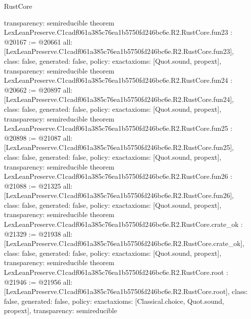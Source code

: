 \begin{lexlean}{RustCore}
\begin{coremodule}
{  transparency: semireducible
}
theorem LexLeanPreserve.C1cadf061a385c76ea1b5750fd246bc6e.R2.RustCore.fun23 : @20167 := @20661 {
  all: [LexLeanPreserve.C1cadf061a385c76ea1b5750fd246bc6e.R2.RustCore.fun23],
  class: false,
  generated: false,
  policy: exact{axioms: [Quot.sound, propext]},
  transparency: semireducible
}
theorem LexLeanPreserve.C1cadf061a385c76ea1b5750fd246bc6e.R2.RustCore.fun24 : @20662 := @20897 {
  all: [LexLeanPreserve.C1cadf061a385c76ea1b5750fd246bc6e.R2.RustCore.fun24],
  class: false,
  generated: false,
  policy: exact{axioms: [Quot.sound, propext]},
  transparency: semireducible
}
theorem LexLeanPreserve.C1cadf061a385c76ea1b5750fd246bc6e.R2.RustCore.fun25 : @20898 := @21087 {
  all: [LexLeanPreserve.C1cadf061a385c76ea1b5750fd246bc6e.R2.RustCore.fun25],
  class: false,
  generated: false,
  policy: exact{axioms: [Quot.sound, propext]},
  transparency: semireducible
}
theorem LexLeanPreserve.C1cadf061a385c76ea1b5750fd246bc6e.R2.RustCore.fun26 : @21088 := @21325 {
  all: [LexLeanPreserve.C1cadf061a385c76ea1b5750fd246bc6e.R2.RustCore.fun26],
  class: false,
  generated: false,
  policy: exact{axioms: [Quot.sound, propext]},
  transparency: semireducible
}
theorem LexLeanPreserve.C1cadf061a385c76ea1b5750fd246bc6e.R2.RustCore.crate_ok : @21329 := @21938 {
  all: [LexLeanPreserve.C1cadf061a385c76ea1b5750fd246bc6e.R2.RustCore.crate_ok],
  class: false,
  generated: false,
  policy: exact{axioms: [Quot.sound, propext]},
  transparency: semireducible
}
theorem LexLeanPreserve.C1cadf061a385c76ea1b5750fd246bc6e.R2.RustCore.root : @21946 := @21956 {
  all: [LexLeanPreserve.C1cadf061a385c76ea1b5750fd246bc6e.R2.RustCore.root],
  class: false,
  generated: false,
  policy: exact{axioms: [Classical.choice, Quot.sound, propext]},
  transparency: semireducible
}


\end{coremodule}
\end{lexlean}
